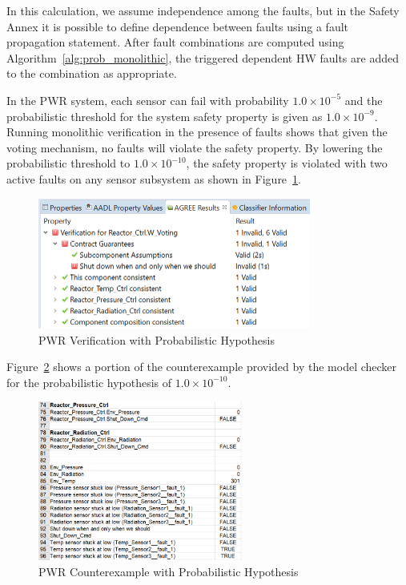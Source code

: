 In this calculation, we assume independence among the faults, but in the Safety Annex it is possible to define dependence between faults using a fault propagation statement. After fault combinations are computed using Algorithm~\ref{alg:prob_monolithic}, the triggered dependent HW faults are added to the combination as appropriate. 

In the PWR system, each sensor can fail with probability $1.0 \times 10^{-5}$ and the probabilistic threshold for the system safety property is given as $1.0 \times 10^{-9}$. Running monolithic verification in the presence of faults shows that given the voting mechanism, no faults will violate the safety property. By lowering the probabilistic threshold to $1.0 \times 10^{-10}$, the safety property is violated with two active faults on any sensor subsystem as shown in Figure~\ref{fig:probPWRVerif}.

\begin{figure}[h!]
		\includegraphics[width=0.8\textwidth]{images/probPWRVerif.png}
	\caption{PWR Verification with Probabilistic Hypothesis}
	\label{fig:probPWRVerif}
\end{figure}

Figure~\ref{fig:probPWRVerifCoex} shows a portion of the counterexample provided by the model checker for the probabilistic hypothesis of $1.0 \times 10^{-10}$. 

\begin{figure}[h!]
		\includegraphics[width=0.6\textwidth]{images/probPWRVerifCoex.png}
	\caption{PWR Counterexample with Probabilistic Hypothesis}
	\label{fig:probPWRVerifCoex}
\end{figure}


